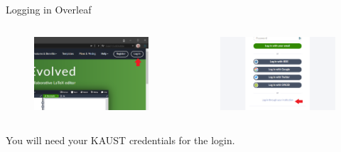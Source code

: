 \documentclass[aspectratio=169]{beamer}
\begin{document}
\begin{frame}{Logging in Overleaf}
    \begin{columns}[c]
        \begin{column}{.5\textwidth}
            \begin{figure}
                \centering
                \includegraphics[scale=0.27]{images/overleaf_login.png}
            \end{figure}      
        \end{column}

        \begin{column}{.5\textwidth}
            \begin{figure}
                \centering
                \includegraphics[scale=0.27]{images/overleaf_login_institution.png}
            \end{figure}
        \end{column}
    \end{columns}

    You will need your KAUST credentials for the login.
\end{frame}
\end{document}

